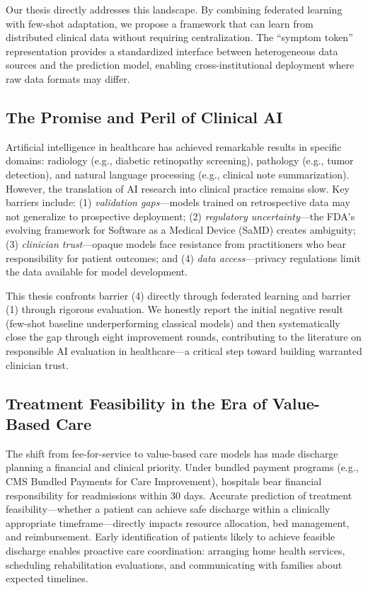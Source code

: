 Our thesis directly addresses this landscape. By combining federated learning with few-shot adaptation, we propose a framework that can learn from distributed clinical data without requiring centralization. The ``symptom token'' representation provides a standardized interface between heterogeneous data sources and the prediction model, enabling cross-institutional deployment where raw data formats may differ.

\subsection{The Promise and Peril of Clinical AI}

Artificial intelligence in healthcare has achieved remarkable results in specific domains: radiology (e.g., diabetic retinopathy screening), pathology (e.g., tumor detection), and natural language processing (e.g., clinical note summarization). However, the translation of AI research into clinical practice remains slow. Key barriers include: (1) \emph{validation gaps}---models trained on retrospective data may not generalize to prospective deployment; (2) \emph{regulatory uncertainty}---the FDA's evolving framework for Software as a Medical Device (SaMD) creates ambiguity; (3) \emph{clinician trust}---opaque models face resistance from practitioners who bear responsibility for patient outcomes; and (4) \emph{data access}---privacy regulations limit the data available for model development.

This thesis confronts barrier (4) directly through federated learning and barrier (1) through rigorous evaluation. We honestly report the initial negative result (few-shot baseline underperforming classical models) and then systematically close the gap through eight improvement rounds, contributing to the literature on responsible AI evaluation in healthcare---a critical step toward building warranted clinician trust.

\subsection{Treatment Feasibility in the Era of Value-Based Care}

The shift from fee-for-service to value-based care models has made discharge planning a financial and clinical priority. Under bundled payment programs (e.g., CMS Bundled Payments for Care Improvement), hospitals bear financial responsibility for readmissions within 30 days. Accurate prediction of treatment feasibility---whether a patient can achieve safe discharge within a clinically appropriate timeframe---directly impacts resource allocation, bed management, and reimbursement. Early identification of patients likely to achieve feasible discharge enables proactive care coordination: arranging home health services, scheduling rehabilitation evaluations, and communicating with families about expected timelines.

